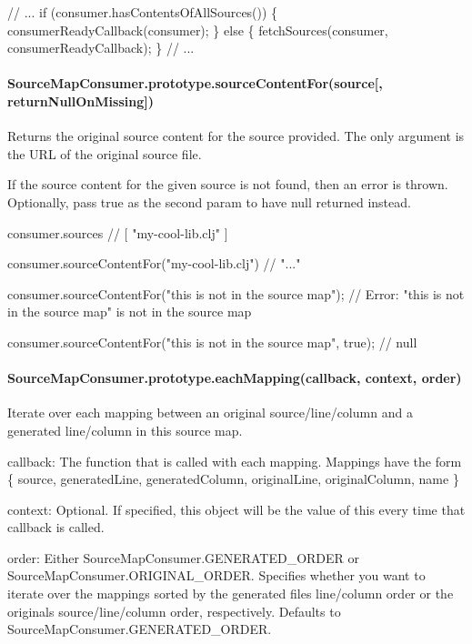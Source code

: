 \begin{DoxyCode}
// ...
if (consumer.hasContentsOfAllSources()) \{
  consumerReadyCallback(consumer);
\} else \{
  fetchSources(consumer, consumerReadyCallback);
\}
// ...
\end{DoxyCode}


\paragraph*{Source\+Map\+Consumer.\+prototype.\+source\+Content\+For(source\mbox{[}, return\+Null\+On\+Missing\mbox{]})}

Returns the original source content for the source provided. The only argument is the U\+RL of the original source file.

If the source content for the given source is not found, then an error is thrown. Optionally, pass {\ttfamily true} as the second param to have {\ttfamily null} returned instead.


\begin{DoxyCode}
consumer.sources
// [ "my-cool-lib.clj" ]

consumer.sourceContentFor("my-cool-lib.clj")
// "..."

consumer.sourceContentFor("this is not in the source map");
// Error: "this is not in the source map" is not in the source map

consumer.sourceContentFor("this is not in the source map", true);
// null
\end{DoxyCode}


\paragraph*{Source\+Map\+Consumer.\+prototype.\+each\+Mapping(callback, context, order)}

Iterate over each mapping between an original source/line/column and a generated line/column in this source map.


\begin{DoxyItemize}
\item {\ttfamily callback}\+: The function that is called with each mapping. Mappings have the form {\ttfamily \{ source, generated\+Line, generated\+Column, original\+Line, original\+Column, name \}}
\item {\ttfamily context}\+: Optional. If specified, this object will be the value of {\ttfamily this} every time that {\ttfamily callback} is called.
\item {\ttfamily order}\+: Either {\ttfamily Source\+Map\+Consumer.\+G\+E\+N\+E\+R\+A\+T\+E\+D\+\_\+\+O\+R\+D\+ER} or {\ttfamily Source\+Map\+Consumer.\+O\+R\+I\+G\+I\+N\+A\+L\+\_\+\+O\+R\+D\+ER}. Specifies whether you want to iterate over the mappings sorted by the generated file\textquotesingle{}s line/column order or the original\textquotesingle{}s source/line/column order, respectively. Defaults to {\ttfamily Source\+Map\+Consumer.\+G\+E\+N\+E\+R\+A\+T\+E\+D\+\_\+\+O\+R\+D\+ER}.
\end{DoxyItemize}


